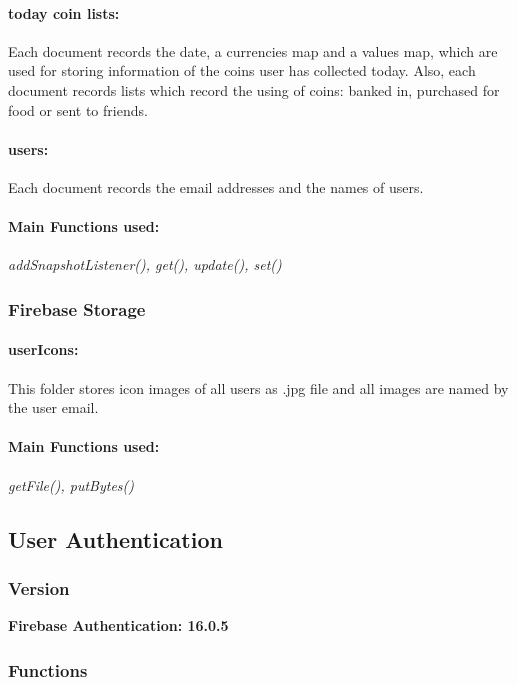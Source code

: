 \documentclass[12pt]{article}
\begin{document}
\paragraph{today coin lists:}
Each document records the date, a currencies map and a values map, which are used for storing information of the coins user has collected today. Also, each document records lists which record the using of coins: banked in, purchased for food or sent to friends.
\paragraph{users:}
Each document records the email addresses and the names of users.
\paragraph{Main Functions used:} \textit{addSnapshotListener(), get(), update(), set()}
\subsubsection{Firebase Storage}
\paragraph{userIcons:} This folder stores icon images of all users as .jpg file and all images are named by the user email.
\paragraph{Main Functions used:} \textit{getFile(), putBytes()}

\subsection{User Authentication}
\subsubsection{Version}
\hspace{12pt}\textbf{Firebase Authentication: 16.0.5}
\subsubsection{Functions}
\end{document}
